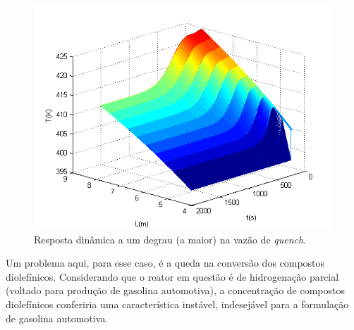 \begin{figure}[htb]
\centering
\includegraphics[scale=0.8]{images/Chap4/Quench_F_30790_catalyst_influence.png}
\caption{Resposta dinâmica a um degrau (a maior) na vazão de \emph{quench}.}
\label{fig:Quench_F_30790_catalyst_influence}
\end{figure}

Um problema aqui, para esse caso, é a queda na conversão dos
compostos diolefínicos. Considerando que o reator em questão é de hidrogenação
parcial (voltado para produção de gasolina automotiva), a concentração de
compostos diolefínicos conferiria uma característica instável, indesejável para
a formulação de gasolina automotiva.
